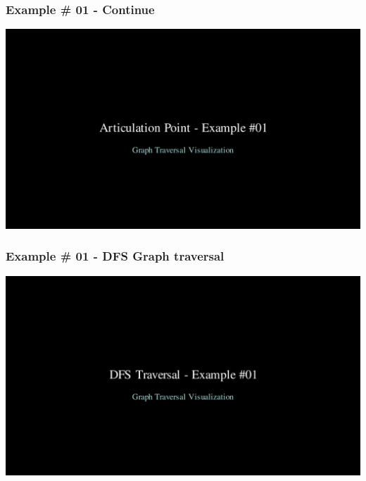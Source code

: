 \begin{frame}
\begin{center}
        \hspace{3cm} %
       
    \end{center}

\end{frame}


\begin{frame}
    \frametitle{Example \# 01 - Continue}
    \begin{center}
        \href{https://drive.google.com/file/d/1qEE1As0QusE928N4wITiYJYmUcZanK3L/view?usp=sharing}{\includegraphics[width=\linewidth]{figures/general/exm01.png}}
    \end{center}
\end{frame}

\begin{frame}
    \frametitle{Example \# 01 - DFS Graph traversal}
    \begin{center}
        \href{https://drive.google.com/file/d/1h2zJHoirxqV9HhY3J9XQs5IgGjNX7waE/view?usp=sharing}{\includegraphics[width=\linewidth]{figures/general/dfs.png}}
    \end{center}
\end{frame}

